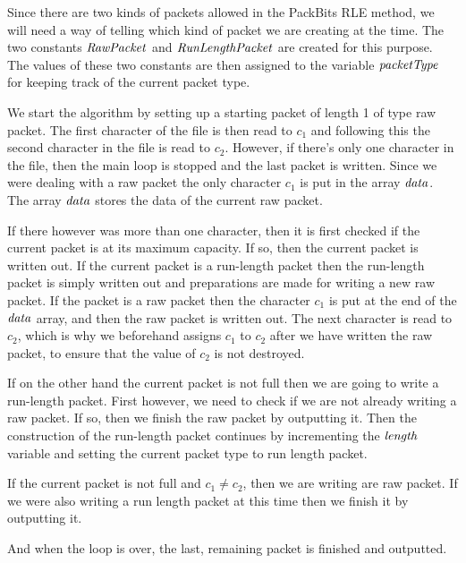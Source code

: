 Since there are two kinds of packets allowed in the PackBits RLE
method, we will need a way of telling which kind of packet we are
creating at the time. The two constants $\mathit{RawPacket}$ and
$\mathit{RunLengthPacket}$ are created for this purpose. The values of these
two constants are then assigned to the variable $\mathit{packetType}$ for
keeping track of the current packet type.

We start the algorithm by setting up a starting packet of length 1 of
type raw packet. The first character of the file is then read to $c_1$
and following this the second character in the file is read to
$c_2$. However, if there's only one character in the file, then the
main loop is stopped and the last packet is written. Since we were
dealing with a raw packet the only character $c_1$ is put in the array
$\mathit{data}$. The array $\mathit{data}$ stores the data of the current
raw packet.

If there however was more than one character, then it is first checked
if the current packet is at its maximum capacity. If so, then the
current packet is written out. If the current packet is a run-length
packet then the run-length packet is simply written out and
preparations are made for writing a new raw packet. If the packet is a
raw packet then the character $c_1$ is put at the end of the $\mathit{data}$
array, and then the raw packet is written out. The next character is
read to $c_2$, which is why we beforehand assigns $c_1$ to $c_2$ after
we have written the raw packet, to ensure that the value of $c_2$ is
not destroyed.

If on the other hand the current packet is not full then we are going
to write a run-length packet. First however, we need to check if we
are not already writing a raw packet. If so, then we finish the raw
packet by outputting it. Then the construction of the run-length
packet continues by incrementing the $\mathit{length}$ variable and setting the
current packet type to run length packet.

If the current packet is not full and $c_1 \neq c_2$, then we are
writing are raw packet. If we were also writing a run length packet at
this time then we finish it by outputting it.

And when the loop is over, the last, remaining packet is finished and
outputted.


